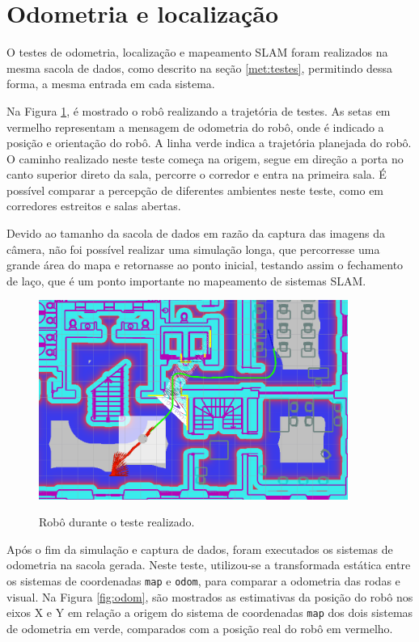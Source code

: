 \documentclass[repeatfields,xlists,xpacks,oneside,yearsonly]{ufrgscca}
\begin{document}
\section{Odometria e localização}

O testes de odometria, localização e mapeamento SLAM foram realizados
na mesma sacola de dados, como descrito na seção \ref{met:testes},
permitindo dessa forma, a mesma entrada em cada sistema.

Na Figura \ref{fig:base_bag}, é mostrado o robô realizando a
trajetória de testes. As setas em vermelho representam a mensagem de
odometria do robô, onde é indicado a posição e orientação do robô. A
linha verde indica a trajetória planejada do robô. O caminho
realizado neste teste começa na origem, segue em direção a porta no
canto superior direto da sala, percorre o corredor e entra na
primeira sala. É possível comparar a percepção de diferentes
ambientes neste teste, como em corredores estreitos e salas abertas.

Devido ao tamanho da sacola de dados em razão da captura das imagens
da câmera, não foi possível realizar uma simulação longa, que
percorresse uma grande área do mapa e retornasse ao ponto inicial,
testando assim o fechamento de laço, que é um ponto importante no
mapeamento de sistemas SLAM.

\begin{figure}[h]
    {
        \centering
        \caption{Robô durante o teste realizado.}
        \label{fig:base_bag}
        \includegraphics[width=0.9\textwidth]{base_bag_sim_zoom.png}\\
    }
\end{figure}

Após o fim da simulação e captura de dados, foram executados os
sistemas de odometria na sacola gerada. Neste teste, utilizou-se a
transformada estática entre os sistemas de coordenadas \texttt{map} e
\texttt{odom}, para comparar a odometria das rodas e visual. Na
Figura \ref{fig:odom}, são mostrados as estimativas da posição do
robô nos eixos X e Y em relação a origem do sistema de coordenadas
\texttt{map} dos dois sistemas de odometria em verde, comparados com
a posição real do robô em vermelho.
\end{document}

